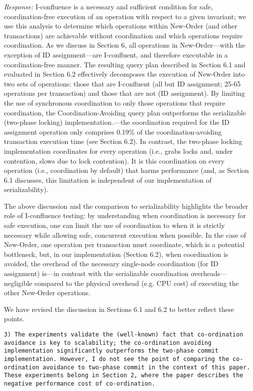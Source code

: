 \documentclass[10pt]{article}
\newcommand{\reviewer}[1] {\noindent\colorbox{reviewercolor}{\parbox{\textwidth}{\noindent\texttt{#1}}}\\}
\newcommand{\response}[1] {\noindent\textit{Response: } #1\\}
\begin{document}
\response{I-confluence is a necessary and sufficient condition for
  safe, coordination-free execution of an operation with respect to a
  given invariant; we use this analysis to determine which operations
  within New-Order (and other transactions) are achievable without
  coordination and which operations require coordination. As we
  discuss in Section 6, all operations in New-Order---with the
  exception of ID assignment---are I-confluent, and therefore
  executable in a coordination-free manner. The resulting query plan
  described in Section 6.1 and evaluated in Section 6.2 effectively
  decomposes the execution of New-Order into two sets of operations:
  those that are I-confluent (all but ID assignment; 25-65 operations
  per transaction) and those that are not (ID assignment). By limiting
  the use of synchronous coordination to only those operations that
  require coordination, the Coordination-Avoiding query plan
  outperforms the serializable (two-phase locking)
  implementation.---the coordination required for the ID assignment
  operation only comprises 0.19\% of the coordination-avoiding
  transaction execution time (see Section 6.2). In contrast, the
  two-phase locking implementation coordinates for every operation
  (i.e., grabs locks and, under contention, slows due to lock
  contention). It is this coordination on every operation (i.e.,
  coordination by default) that harms performance (and, as Section 6.1
  discusses, this limitation is independent of our implementation of serializability).
  
  The above discussion and the comparison to serializability
  highlights the broader role of I-confluence testing: by
  understanding when coordination is necessary for safe execution, one
  can limit the use of coordination to when it is strictly necessary
  while allowing safe, concurrent execution when possible. In the case
  of New-Order, one operation per transaction must coordinate, which
  is a potential bottleneck, but, in our implementation (Section 6.2),
  when coordination is avoided, the overhead of the necessary
  single-node coordination (for ID assignment) is---in contrast with
  the serializable coordination overheads---negligible compared to the
  physical overhead (e.g. CPU cost) of executing the other New-Order
  operations.

  We have revised the discussion in Sections 6.1 and 6.2 to
  better reflect these points.}

\reviewer{3) The experiments validate the (well-known) fact that
  co-ordination avoidance is key to scalability; the co-ordination
  avoiding implementation significantly outperforms the two-phase
  commit implementation. However, I do not see the point of comparing
  the co-ordination avoidance to two-phase commit in the context of
  this paper. These experiments belong in Section 2, where the paper
  describes the negative performance cost of co-ordination.}
\end{document}
